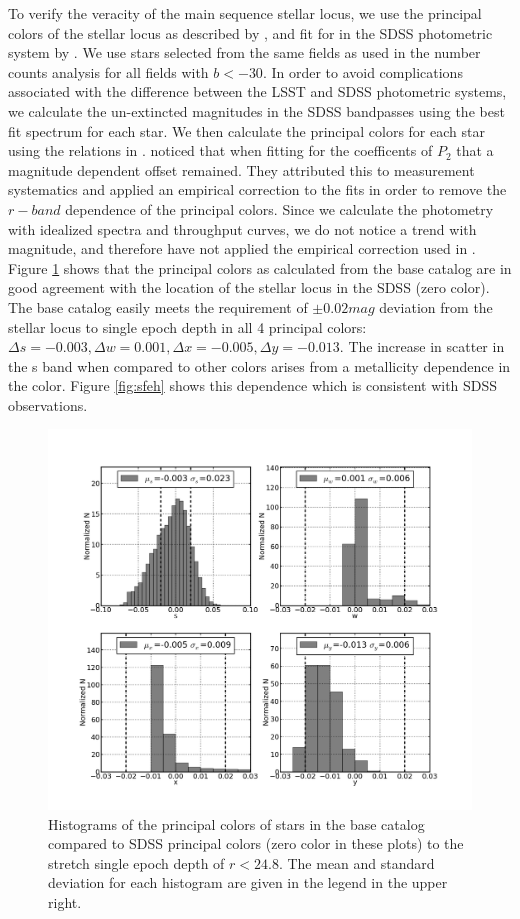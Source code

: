 \documentclass[]{article}
\begin{document}
To verify the veracity of the main sequence stellar locus, we use the
principal colors of the stellar locus as described by \citet{helmi02}, and 
fit for in the SDSS photometric system by \citet{ivezic04}.
We use stars selected from the same fields as used in the number counts analysis for all fields with $b<-30$.
In order to avoid complications associated with the difference between the LSST and SDSS photometric systems, we calculate the un-extincted 
magnitudes in the SDSS bandpasses using the best fit spectrum for each star.  We then calculate
the principal colors for each star using the relations in
\citet{ivezic04}.  \citet{ivezic04} noticed that when fitting for the coefficents of $P_{2}$ that a magnitude dependent offset remained.  They 
attributed this to measurement systematics and applied an empirical correction to the fits in order to remove the $r-band$ dependence of the 
principal colors.  Since we calculate the photometry with idealized spectra and throughput curves, we do not notice a trend with magnitude, and therefore 
have not applied the empirical correction used in \citet{ivezic04}.
Figure
\ref{fig:principalcolorshist} shows that the principal colors as calculated from the base catalog are in good agreement with
the location of the stellar locus in the SDSS (zero color).  The base catalog easily meets the requirement of $\pm0.02mag$ deviation
from the stellar locus to single epoch depth in all 4 principal colors: ${\Delta}s=-0.003, {\Delta}w=0.001, {\Delta}x=-0.005, {\Delta}y=-0.013$.  
The increase in scatter in the s band when compared to other colors arises from a metallicity dependence in the color.  Figure \ref{fig:sfeh} shows this 
dependence which is consistent with SDSS observations.

\begin{figure}[ht]
\centering
\includegraphics[width=5in]{validation_figures/principal_colors_hist.png}
\caption{Histograms of the principal colors of stars in the base
  catalog compared to SDSS principal colors (zero color in these
  plots) to the stretch single epoch depth of $r < 24.8$. The mean and
  standard deviation for each
histogram are given in the legend in the upper right.\label{fig:principalcolorshist}}
\end{figure}
\end{document}
